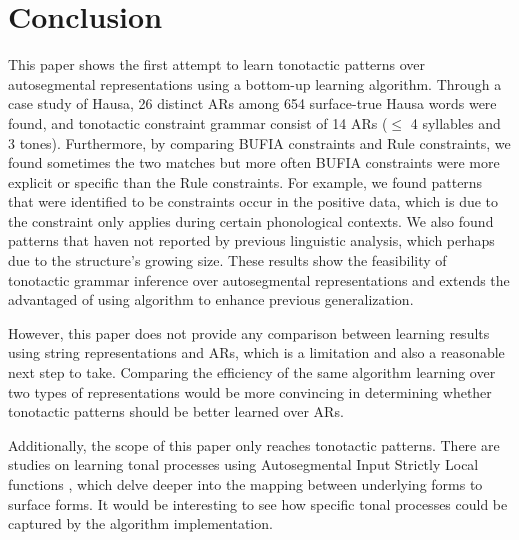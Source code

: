 \documentclass[11pt,letterpaper]{article}
\begin{document}
\section{Conclusion} 
This paper shows the first attempt to learn tonotactic patterns over autosegmental representations using a bottom-up learning algorithm. Through a case study of Hausa, 26 distinct ARs among 654 surface-true Hausa words were found, and tonotactic constraint grammar consist of 14 ARs ($\leq$ 4 syllables and 3 tones). Furthermore, by comparing BUFIA constraints and Rule constraints, we found sometimes the two matches but more often BUFIA constraints were more explicit or specific than the Rule constraints. For example, we found patterns that were identified to be constraints occur in the positive data, which is due to the constraint only applies during certain phonological contexts. We also found patterns that haven not reported by previous linguistic analysis, which perhaps due to the structure's growing size. These results show the feasibility of tonotactic grammar inference over autosegmental representations and extends the advantaged of using algorithm to enhance previous generalization.

However, this paper does not provide any comparison between learning results using string representations and ARs, which is a limitation and also a reasonable next step to take. Comparing the efficiency of the same algorithm learning over two types of representations would be more convincing in determining whether tonotactic patterns should be better learned over ARs.


Additionally, the scope of this paper only reaches tonotactic patterns. There are studies on learning tonal processes using Autosegmental Input Strictly Local functions \citep{chandlee2019autosegmental,zhu2020extending}, which delve deeper into the mapping between underlying forms to surface forms. It would be interesting to see how specific tonal processes could be captured by the algorithm implementation. 
\end{document}
